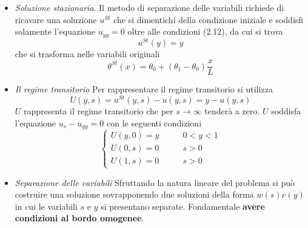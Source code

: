 \documentclass[a4paper,12pt, draft]{article}
\theoremstyle{break}
\numberwithin{equation}{section}
\begin{document}
\begin{itemize}
\item \emph{Soluzione stazionaria}. Il metodo di separazione delle variabili richiede di ricavare una soluzione $u^{St}$ che si dimentichi della condizione iniziale e soddisfi solamente l'equazione $u_{yy} = 0$ oltre alle condizioni (2.12), da cui si trova
$$u^{St}(y) = y$$
che si trasforma nelle variabili originali
$$\theta^{St}(x) = \theta_0 + (\theta_1 -\theta_0) \frac{x}{L}$$
\item \emph{Il regime transitorio} Per rappresentare il regime transitorio si utilizza
$$
U(y,s) = u^{St}(y,s) - u(y,s) = y -u(y,s)
$$
$U$ rappresenta il regime transitorio che per $s \to \infty$ tenderà a zero. $U$ soddisfa l'equazione $u_s - u_{yy} = 0$ con le seguenti condizioni 
\begin{equation}
\begin{cases}
U(y,0) = y & \qquad 0 <y< 1\\
U(0,s) = 0 & \qquad s>0\\
U(1,s) = 0 & \qquad s >0
\end{cases}
\end{equation}
\item \emph{Separazione delle variabili} Sfruttando la natura lineare del problema si può costruire una soluzione sovrapponendo due soluzioni della forma $w(s)v(y)$ in cui le variabili $s \mbox{ e } y$ si presentano separate. Fondamentale \textbf{avere condizioni al bordo omogenee}.
\end{itemize}
\end{document}
